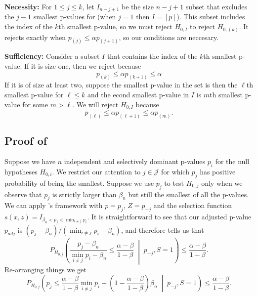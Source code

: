 \documentclass{article}
\begin{document}
\begin{appendix}
\noindent \textbf{Necessity: } For $1 \leq j \leq k$, let $I_{n-j + 1}$ be the size $n - j + 1$ subset that excludes the $j - 1$ smallest p-values for (when $j = 1$ then $I = [p]$). This subset includes the index of the $k$th smallest p-value, so we must reject $H_{0, I}$ to reject $H_{0, (k)}$. It rejects exactly when $p_{(j)} \leq \alpha p_{(j + 1)}$, so our conditions are neccesary. \newline 

\noindent \textbf{Sufficiency: } Consider a subset $I$ that contains the index of the $k$th smallest p-value. If it is size one, then we reject because
\begin{equation*}
    p_{(k)} \leq \alpha p_{(k+1)} \leq \alpha 
\end{equation*}
If it is of size at least two, suppose the smallest p-value in the set is then the $\ell$th smallest p-value for $\ell \leq k$ and the econd smallest p-value in $I$ is $m$th smallest p-value for some $m > \ell$. We will reject $H_{0, I}$ because 
\begin{equation*}
    p_{(\ell)} \leq \alpha p_{(\ell + 1)} \leq \alpha p_{(m)}.
\end{equation*}

\subsection{Proof of }

Suppose we have $n$ independent and selectively dominant p-values $p_i$ for the null hypotheses $H_{0, i}$. We restrict our attention to $j \in \mathcal{J}$ for which $p_j$ has positive probability of being the smallest. Suppose we use $p_j$ to test $H_{0, j}$ only when we observe that $p_j$ is strictly larger than $\beta_n$ but still the smallest of all the p-values. We can apply 's framework with $p=p_j$, $Z = p_{-j}$ and the selection function $s(x, z) = I_{\beta_n < p_j < \min_{i \neq j} p_i}$. It is straightforward to see that our adjusted p-value $p_{adj}$ is $(p_j - \beta_n)/(\min_{i \neq j} p_i - \beta_n)$, and  therefore tells us that 
\begin{equation*}
    P_{H_{0, j}}\left( \frac{p_j - \beta_n}{\min_{i \neq j} p_i - \beta_n} \leq \frac{\alpha -\beta}{1-\beta}  \;\middle|\; p_{-j}, S=1 \right) \leq \frac{\alpha - \beta}{1-\beta}.
\end{equation*}
Re-arranging things we get 
\begin{equation}
    \label{eq:hybrid_tool}
    P_{H_{0, j}}\left( p_j  \leq \frac{\alpha -\beta}{1-\beta}\min_{i \neq j} p_i  + \left( 1 - \frac{\alpha -\beta}{1-\beta}\right) \beta_n  \;\middle|\; p_{-j}, S=1  \right) \leq \frac{\alpha - \beta}{1-\beta}.
\end{equation}



\end{appendix}
\end{document}
